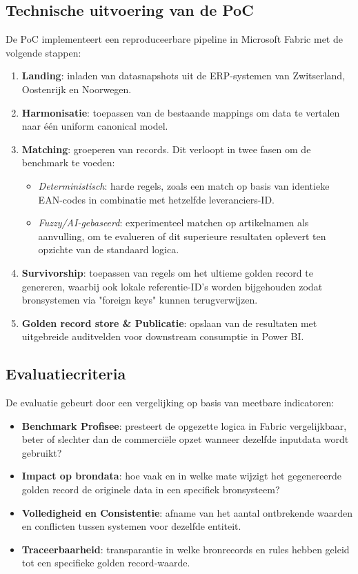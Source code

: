 \subsection{Technische uitvoering van de PoC}
De PoC implementeert een reproduceerbare pipeline in Microsoft Fabric met de volgende stappen:
\begin{enumerate}
  \item \textbf{Landing}: inladen van datasnapshots uit de ERP-systemen van Zwitserland, Oostenrijk en Noorwegen.
  \item \textbf{Harmonisatie}: toepassen van de bestaande mappings om data te vertalen naar één uniform canonical model.
  \item \textbf{Matching}: groeperen van records. Dit verloopt in twee fasen om de benchmark te voeden:
  \begin{itemize}
      \item \emph{Deterministisch}: harde regels, zoals een match op basis van identieke EAN-codes in combinatie met hetzelfde leveranciers-ID.
      \item \emph{Fuzzy/AI-gebaseerd}: experimenteel matchen op artikelnamen als aanvulling, om te evalueren of dit superieure resultaten oplevert ten opzichte van de standaard logica.
  \end{itemize}
  \item \textbf{Survivorship}: toepassen van regels om het ultieme golden record te genereren, waarbij ook lokale referentie-ID's worden bijgehouden zodat bronsystemen via "foreign keys" kunnen terugverwijzen.
  \item \textbf{Golden record store \& Publicatie}: opslaan van de resultaten met uitgebreide auditvelden voor downstream consumptie in Power BI.
\end{enumerate}

\subsection{Evaluatiecriteria}
De evaluatie gebeurt door een vergelijking op basis van meetbare indicatoren:
\begin{itemize}
  \item \textbf{Benchmark Profisee}: presteert de opgezette logica in Fabric vergelijkbaar, beter of slechter dan de commerciële opzet wanneer dezelfde inputdata wordt gebruikt?
  \item \textbf{Impact op brondata}: hoe vaak en in welke mate wijzigt het gegenereerde golden record de originele data in een specifiek bronsysteem?
  \item \textbf{Volledigheid en Consistentie}: afname van het aantal ontbrekende waarden en conflicten tussen systemen voor dezelfde entiteit.
  \item \textbf{Traceerbaarheid}: transparantie in welke bronrecords en rules hebben geleid tot een specifieke golden record-waarde.
\end{itemize}

